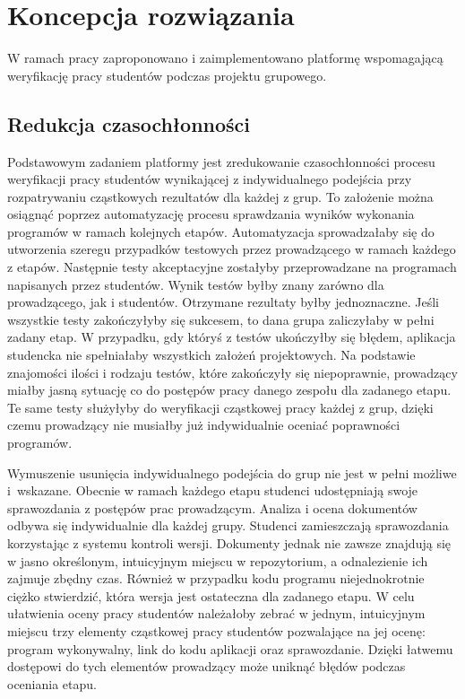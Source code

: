 \chapter{Koncepcja rozwiązania}
\label{chapter:requirements}

W ramach pracy zaproponowano i zaimplementowano platformę wspomagającą weryfikację pracy studentów podczas projektu grupowego.

\section{Redukcja czasochłonności}

Podstawowym zadaniem platformy jest zredukowanie czasochłonności procesu weryfikacji pracy studentów wynikającej z indywidualnego podejścia przy rozpatrywaniu cząstkowych rezultatów dla każdej z grup.
To założenie można osiągnąć poprzez automatyzację procesu sprawdzania wyników wykonania programów w ramach kolejnych etapów.
Automatyzacja sprowadzałaby się do utworzenia szeregu przypadków testowych przez prowadzącego w ramach każdego z etapów.
Następnie testy akceptacyjne zostałyby przeprowadzane na programach napisanych przez studentów.
Wynik testów byłby znany zarówno dla prowadzącego, jak i studentów.
Otrzymane rezultaty byłby jednoznaczne.
Jeśli wszystkie testy zakończyłyby się sukcesem, to dana grupa zaliczyłaby w pełni zadany etap.
W przypadku, gdy któryś z testów ukończyłby się błędem, aplikacja studencka nie spełniałaby wszystkich założeń projektowych.
Na podstawie znajomości ilości i rodzaju testów, które zakończyły się niepoprawnie, prowadzący miałby jasną sytuację co do postępów pracy danego zespołu dla zadanego etapu.
Te same testy służyłyby do weryfikacji cząstkowej pracy każdej z grup, dzięki czemu prowadzący nie musiałby już indywidualnie oceniać poprawności programów.

Wymuszenie usunięcia indywidualnego podejścia do grup nie jest w pełni możliwe i~wskazane.
Obecnie w ramach każdego etapu studenci udostępniają swoje sprawozdania z postępów prac prowadzącym.
Analiza i ocena dokumentów odbywa się indywidualnie dla każdej grupy.
Studenci zamieszczają sprawozdania korzystając z systemu kontroli wersji.
Dokumenty jednak nie zawsze znajdują się w jasno określonym, intuicyjnym miejscu w repozytorium, a odnalezienie ich zajmuje zbędny czas.
Również w przypadku kodu programu niejednokrotnie ciężko stwierdzić, która wersja jest ostateczna dla zadanego etapu.
W celu ułatwienia oceny pracy studentów należałoby zebrać w jednym, intuicyjnym miejscu trzy elementy cząstkowej pracy studentów pozwalające na jej ocenę: program wykonywalny, link do kodu aplikacji oraz sprawozdanie.
Dzięki łatwemu dostępowi do tych elementów prowadzący może uniknąć błędów podczas oceniania etapu.

